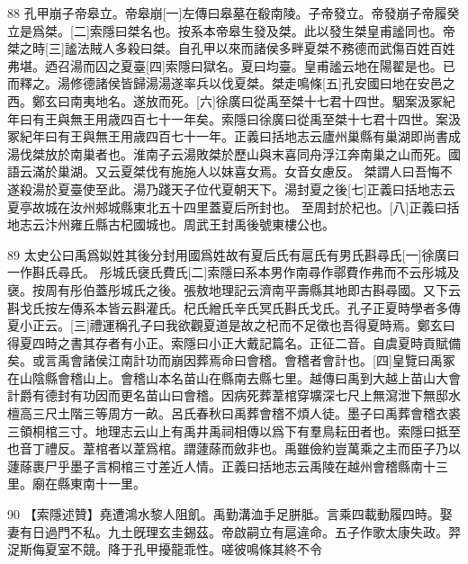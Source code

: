 88
孔甲崩子帝皋立。帝皋崩[一]左傳曰皋墓在殽南陵。子帝發立。帝發崩子帝履癸立是爲桀。[二]索隱曰桀名也。按系本帝皋生發及桀。此以發生桀皇甫謐同也。帝桀之時[三]謐法賊人多殺曰桀。自孔甲以來而諸侯多畔夏桀不務德而武傷百姓百姓弗堪。迺召湯而囚之夏臺[四]索隱曰獄名。夏曰均臺。皇甫謐云地在陽翟是也。已而釋之。湯修德諸侯皆歸湯湯遂率兵以伐夏桀。桀走鳴條[五]孔安國曰地在安邑之西。鄭玄曰南夷地名。遂放而死。[六]徐廣曰從禹至桀十七君十四世。駰案汲冢紀年曰有王與無王用歳四百七十一年矣。索隱曰徐廣曰從禹至桀十七君十四世。案汲冢紀年曰有王與無王用歳四百七十一年。正義曰括地志云廬州巢縣有巢湖即尚書成湯伐桀放於南巢者也。淮南子云湯敗桀於歷山與末喜同舟浮江奔南巢之山而死。國語云滿於巢湖。又云夏桀伐有施施人以妺喜女焉。女音女慮反。 桀謂人曰吾悔不遂殺湯於夏臺使至此。湯乃踐天子位代夏朝天下。湯封夏之後[七]正義曰括地志云夏亭故城在汝州郟城縣東北五十四里蓋夏后所封也。 至周封於杞也。[八]正義曰括地志云汴州雍丘縣古杞國城也。周武王封禹後號東樓公也。

89
太史公曰禹爲姒姓其後分封用國爲姓故有夏后氏有扈氏有男氏斟尋氏[一]徐廣曰一作斟氏尋氏。 彤城氏襃氏費氏[二]索隱曰系本男作南尋作鄩費作弗而不云彤城及襃。按周有彤伯蓋彤城氏之後。張敖地理記云濟南平壽縣其地即古斟尋國。又下云斟戈氏按左傳系本皆云斟灌氏。杞氏繒氏辛氏冥氏斟氏戈氏。孔子正夏時學者多傳夏小正云。[三]禮運稱孔子曰我欲觀夏道是故之杞而不足徵也吾得夏時焉。鄭玄曰得夏四時之書其存者有小正。索隱曰小正大戴記篇名。正征二音。自虞夏時貢賦備矣。或言禹會諸侯江南計功而崩因葬焉命曰會稽。會稽者會計也。[四]皇覽曰禹冢在山陰縣會稽山上。會稽山本名苗山在縣南去縣七里。越傳曰禹到大越上苗山大會計爵有德封有功因而更名苗山曰會稽。因病死葬葦棺穿壙深七尺上無瀉泄下無邸水檀高三尺土階三等周方一畝。呂氏春秋曰禹葬會稽不煩人徒。墨子曰禹葬會稽衣裘三領桐棺三寸。地理志云山上有禹井禹祠相傳以爲下有羣鳥耘田者也。索隱曰抵至也音丁禮反。葦棺者以葦爲棺。謂蘧蒢而斂非也。禹雖儉約豈萬乘之主而臣子乃以蘧蒢裹尸乎墨子言桐棺三寸差近人情。正義曰括地志云禹陵在越州會稽縣南十三里。廟在縣東南十一里。

90
【索隱述贊】堯遭鴻水黎人阻飢。禹勤溝洫手足胼胝。言乘四載動履四時。娶妻有日過門不私。九土旣理玄圭錫茲。帝啟嗣立有扈違命。五子作歌太康失政。羿浞斯侮夏室不競。降于孔甲擾龍乖性。嗟彼鳴條其終不令
